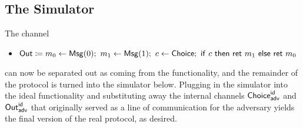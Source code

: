 \subsection{The Simulator}
The channel
\begin{itemize}
\item $\Out \coloneqq m_0 \leftarrow \Msg(0); \ m_1 \leftarrow \Msg(1); \ c \leftarrow \Choice; \ \ifte{c}{\ret{m_1}}{\ret{m_0}}$
\end{itemize}
can now be separated out as coming from the functionality, and the remainder of the protocol is turned into the simulator below. Plugging in the simulator into the ideal functionality and substituting away the internal channels $\mathsf{Choice}^{\mathsf{id}}_{\mathsf{adv}}$ and $\mathsf{Out}^{\mathsf{id}}_{\mathsf{adv}}$ that originally served as a line of communication for the adversary yields the final version of the real protocol, as desired.

